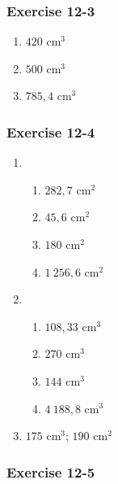 {\begin{multicols}{3}
\subsubsection*{Exercise 12-3} %

\begin{enumerate}[noitemsep, label=\textbf{\arabic*}. ] 
\item $420$ cm$^3$
\item $500$ cm$^3$
\item $785,4$ cm$^3$
\end{enumerate}

\subsubsection*{Exercise 12-4} %

\begin{enumerate}[noitemsep, label=\textbf{\arabic*}. ] 
\item %
    \begin{enumerate}[noitemsep, label=\textbf{\alph*}. ]
	  \item $282,7$ cm$^2$
\item  $45,6$ cm$^2$
	  \item $180$ cm$^2$
	  
	  \item $1~256,6$ cm$^2$
    \end{enumerate}
\item %
    \begin{enumerate}[noitemsep, label=\textbf{\alph*}. ]
	  \item $108,33$ cm$^3$
	  \item $270$ cm$^3$
	  \item  $144$ cm$^3$
	  \item $4~188,8$ cm$^3$
    \end{enumerate}
\item %
 $175$ cm$^3$; $190$ cm$^2$
    \end{enumerate}


\subsubsection*{Exercise 12-5} %


\end{multicols}}
